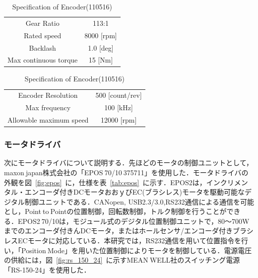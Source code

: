 \documentclass[a4paper,12pt]{article_vdlab_sotsuron}
\begin{document}
\vspace*{10mm}
\begin{table}[htp]
  \begin{minipage}{0.5\textwidth}
    \begin{center}
      \makeatletter
	\def\@captype{table}
	\makeatother
	\caption{Specification Gearhead(203126)}
	\label{tab:Gearhead}
	  \begin{tabular}{cc}\hline
	    Gear Ratio & 113:1 \\
	    Rated speed & 8000 [rpm] \\
	    Backlash & 1.0 [deg] \\
	    Max continuous torque & 15 [Nm] \\\hline
	  \end{tabular}
    \end{center}
  \end{minipage}
  \begin{minipage}{0.5\textwidth}
      \begin{center}
	\makeatletter
	\def\@captype{table}
	\makeatother
	\caption{Specification of Encoder(110516)}
	\label{tab:Encoder}
	  \begin{tabular}{cc}\hline
	    Encoder Resolution & 500 [count/rev] \\
	    Max frequency & 100 [kHz] \\
	    Allowable maximum speed & 12000 [rpm] \\\hline
	  \end{tabular}
	\end{center}
  \end{minipage}
\end{table}

\newpage
\subsubsection{モータドライバ}
次にモータドライバについて説明する．先ほどのモータの制御ユニットとして，maxon$\ $japan株式会社の「EPOS$\ $70/10$\ $375711」を使用した．モータドライバの外観を図~\ref{fig:epos}~に，仕様を表~\ref{tab:epos}~に示す．EPOS2は，インクリメンタル・エンコーダ付きDCモータおおｙびEC(ブラシレス)モータを駆動可能なデジタル制御ユニットである．CANopen, USB2.3/3.0,RS232通信による通信を可能とし，Point$\ $to$\ $Pointの位置制御，回転数制御，トルク制御を行うことができる．EPOS2$\ $70/10は，モジュール式のデジタル位置制御ユニットで，80～700Wまでのエンコーダ付きんDCモータ，またはホールセンサ/エンコーダ付きブラシレスECモータに対応している．本研究では，RS232通信を用いて位置指令を行い，「Position$\ $Mode」を用いた位置制御によりモータを制御している．電源電圧の供給には，図~\ref{fig:rs_150_24}~に示すMEAN$\ $WELL社のスイッチング電源「RS-150-24」を使用した．
\end{document}
